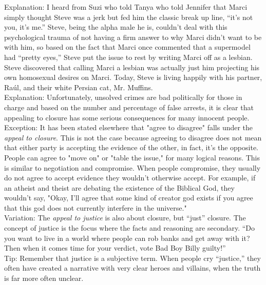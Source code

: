 \documentclass[a4paper,12pt,single,pdftex]{scrbook}
\begin{document}
{    
      Explanation: I heard from Suzi who told Tanya who told Jennifer that Marci simply thought Steve was a jerk but fed him the classic break up line, “it’s not you, it’s me.” Steve, being the alpha male he is, couldn’t deal with this psychological trauma of not having a firm answer to why Marci didn’t want to be with him, so based on the fact that Marci once commented that a supermodel had “pretty eyes,” Steve put the issue to rest by writing Marci off as a lesbian. Steve discovered that calling Marci a lesbian was actually just him projecting his own homosexual desires on Marci. Today, Steve is living happily with his partner, Raúl, and their white Persian cat, Mr. Muffins.
    \\

    
      Explanation: Unfortunately, unsolved crimes are bad politically for those in charge and based on the number and percentage of false arrests, it is clear that appealing to closure has some serious consequences for many innocent people.
    \\

    
      Exception: It has been stated elsewhere that "agree to disagree" falls under the {\it appeal to closure}. This is not the case because agreeing to disagree does not mean that either party is accepting the evidence of the other, in fact, it's the opposite. People can agree to "move on" or "table the issue," for many logical reasons. This is similar to negotiation and compromise. When people compromise, they usually do not agree to accept evidence they wouldn't otherwise accept. For example, if an atheist and theist are debating the existence of the Biblical God, they wouldn't say, "Okay, I'll agree that some kind of creator god exists if you agree that this god does not currently interfere in the universe."
    \\

    
      Variation: The {\em appeal to justice} is also about closure, but “just” closure. The concept of justice is the focus where the facts and reasoning are secondary. “Do you want to live in a world where people can rob banks and get away with it? Then when it comes time for your verdict, vote Bad Boy Billy guilty!”
    \\

    
      Tip: Remember that justice is a subjective term. When people cry “justice,” they often have created a narrative with very clear heroes and villains, when the truth is far more often unclear.
    \\

  }
\end{document}
